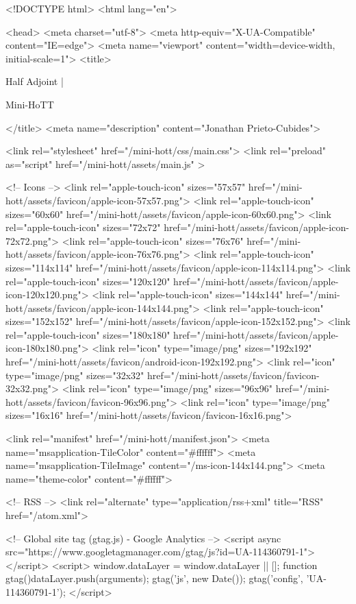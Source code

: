 <!DOCTYPE html>
<html lang="en">

<head>
  <meta charset="utf-8">
  <meta http-equiv="X-UA-Compatible" content="IE=edge">
  <meta name="viewport" content="width=device-width, initial-scale=1">
  <title>
    
      
        Half Adjoint |
      
        Mini-HoTT
    
  </title>
  <meta name="description" content="Jonathan Prieto-Cubides">

  <link rel="stylesheet" href="/mini-hott/css/main.css">
  <link rel="preload" as="script" href="/mini-hott/assets/main.js" >

  <!-- Icons -->
  <link rel="apple-touch-icon" sizes="57x57" href="/mini-hott/assets/favicon/apple-icon-57x57.png">
  <link rel="apple-touch-icon" sizes="60x60" href="/mini-hott/assets/favicon/apple-icon-60x60.png">
  <link rel="apple-touch-icon" sizes="72x72" href="/mini-hott/assets/favicon/apple-icon-72x72.png">
  <link rel="apple-touch-icon" sizes="76x76" href="/mini-hott/assets/favicon/apple-icon-76x76.png">
  <link rel="apple-touch-icon" sizes="114x114" href="/mini-hott/assets/favicon/apple-icon-114x114.png">
  <link rel="apple-touch-icon" sizes="120x120" href="/mini-hott/assets/favicon/apple-icon-120x120.png">
  <link rel="apple-touch-icon" sizes="144x144" href="/mini-hott/assets/favicon/apple-icon-144x144.png">
  <link rel="apple-touch-icon" sizes="152x152" href="/mini-hott/assets/favicon/apple-icon-152x152.png">
  <link rel="apple-touch-icon" sizes="180x180" href="/mini-hott/assets/favicon/apple-icon-180x180.png">
  <link rel="icon" type="image/png" sizes="192x192"  href="/mini-hott/assets/favicon/android-icon-192x192.png">
  <link rel="icon" type="image/png" sizes="32x32" href="/mini-hott/assets/favicon/favicon-32x32.png">
  <link rel="icon" type="image/png" sizes="96x96" href="/mini-hott/assets/favicon/favicon-96x96.png">
  <link rel="icon" type="image/png" sizes="16x16" href="/mini-hott/assets/favicon/favicon-16x16.png">

  <link rel="manifest" href="/mini-hott/manifest.json">
  <meta name="msapplication-TileColor" content="#ffffff">
  <meta name="msapplication-TileImage" content="/ms-icon-144x144.png">
  <meta name="theme-color" content="#ffffff">

  <!-- RSS -->
  <link rel="alternate" type="application/rss+xml" title="RSS" href="/atom.xml">

  <!-- Global site tag (gtag.js) - Google Analytics -->
  <script async src="https://www.googletagmanager.com/gtag/js?id=UA-114360791-1"></script>
  <script>
    window.dataLayer = window.dataLayer || [];
    function gtag(){dataLayer.push(arguments);}
    gtag('js', new Date());
    gtag('config', 'UA-114360791-1');
  </script>

